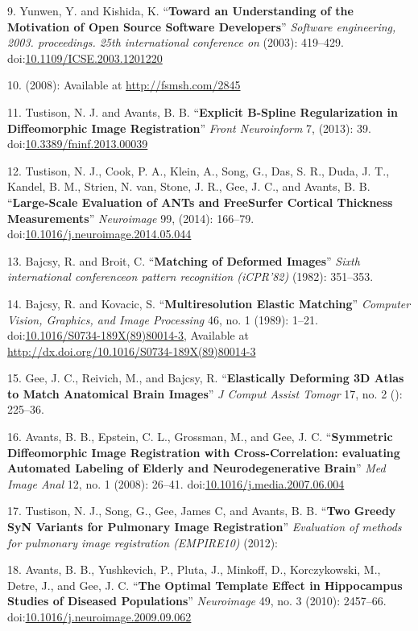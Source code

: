 \documentclass[11pt,]{article}
\begin{document}
9. Yunwen, Y. and Kishida, K. ``\textbf{Toward an Understanding of the
Motivation of Open Source Software Developers}'' \emph{Software
engineering, 2003. proceedings. 25th international conference on}
(2003): 419--429.
doi:\href{http://dx.doi.org/10.1109/ICSE.2003.1201220}{10.1109/ICSE.2003.1201220}

10. (2008): Available at \url{http://fsmsh.com/2845}

11. Tustison, N. J. and Avants, B. B. ``\textbf{Explicit B-Spline
Regularization in Diffeomorphic Image Registration}'' \emph{Front
Neuroinform} 7, (2013): 39.
doi:\href{http://dx.doi.org/10.3389/fninf.2013.00039}{10.3389/fninf.2013.00039}

12. Tustison, N. J., Cook, P. A., Klein, A., Song, G., Das, S. R., Duda,
J. T., Kandel, B. M., Strien, N. van, Stone, J. R., Gee, J. C., and
Avants, B. B. ``\textbf{Large-Scale Evaluation of ANTs and FreeSurfer
Cortical Thickness Measurements}'' \emph{Neuroimage} 99, (2014):
166--79.
doi:\href{http://dx.doi.org/10.1016/j.neuroimage.2014.05.044}{10.1016/j.neuroimage.2014.05.044}

13. Bajcsy, R. and Broit, C. ``\textbf{Matching of Deformed Images}''
\emph{Sixth international conferenceon pattern recognition (iCPR'82)}
(1982): 351--353.

14. Bajcsy, R. and Kovacic, S. ``\textbf{Multiresolution Elastic
Matching}'' \emph{Computer Vision, Graphics, and Image Processing} 46,
no. 1 (1989): 1--21.
doi:\href{http://dx.doi.org/10.1016/S0734-189X(89)80014-3}{10.1016/S0734-189X(89)80014-3},
Available at \url{http://dx.doi.org/10.1016/S0734-189X(89)80014-3}

15. Gee, J. C., Reivich, M., and Bajcsy, R. ``\textbf{Elastically
Deforming 3D Atlas to Match Anatomical Brain Images}'' \emph{J Comput
Assist Tomogr} 17, no. 2 (): 225--36.

16. Avants, B. B., Epstein, C. L., Grossman, M., and Gee, J. C.
``\textbf{Symmetric Diffeomorphic Image Registration with
Cross-Correlation: evaluating Automated Labeling of Elderly and
Neurodegenerative Brain}'' \emph{Med Image Anal} 12, no. 1 (2008):
26--41.
doi:\href{http://dx.doi.org/10.1016/j.media.2007.06.004}{10.1016/j.media.2007.06.004}

17. Tustison, N. J., Song, G., Gee, James C, and Avants, B. B.
``\textbf{Two Greedy SyN Variants for Pulmonary Image Registration}''
\emph{Evaluation of methods for pulmonary image registration (EMPIRE10)}
(2012):

18. Avants, B. B., Yushkevich, P., Pluta, J., Minkoff, D., Korczykowski,
M., Detre, J., and Gee, J. C. ``\textbf{The Optimal Template Effect in
Hippocampus Studies of Diseased Populations}'' \emph{Neuroimage} 49, no.
3 (2010): 2457--66.
doi:\href{http://dx.doi.org/10.1016/j.neuroimage.2009.09.062}{10.1016/j.neuroimage.2009.09.062}
\end{document}
